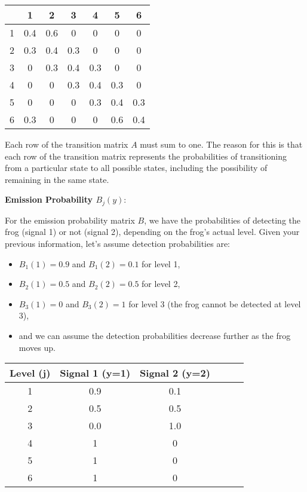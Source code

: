 \documentclass[10pt]{article}
\begin{document}
\begin{table}[h]
\begin{center}
\begin{tabular}{|c|c|c|c|c|c|c|}
\hline
 & 1 & 2 & 3 & 4 & 5 & 6\\
\hline
1 & 0.4 & 0.6 & 0 & 0 & 0 & 0 \\
\hline
2 & 0.3 & 0.4 & 0.3 & 0 & 0 & 0 \\
\hline
3 & 0 & 0.3 & 0.4 & 0.3 & 0 & 0 \\
\hline
4 & 0 & 0 & 0.3 & 0.4 & 0.3 & 0 \\
\hline
5 & 0 & 0 & 0 & 0.3 & 0.4 & 0.3 \\
\hline
6 & 0.3 & 0 & 0 & 0 & 0.6 & 0.4 \\
\hline
\end{tabular}
\end{center}
\end{table}

Each row of the transition matrix \( A \) must sum to one. The reason for this is that each row of the transition matrix represents the probabilities of transitioning from a particular state to all possible states, including the possibility of remaining in the same state.

\textbf{Emission Probability \( B_j(y) \)}:

For the emission probability matrix \( B \), we have the probabilities of detecting the frog (signal 1) or not (signal 2), depending on the frog's actual level. Given your previous information, let's assume detection probabilities are:

\begin{itemize}
  \item \( B_1(1) = 0.9 \) and \( B_1(2) = 0.1 \) for level 1,
  \item \( B_2(1) = 0.5 \) and \( B_2(2) = 0.5 \) for level 2,
  \item \( B_3(1) = 0 \) and \( B_3(2) = 1 \) for level 3 (the frog cannot be detected at level 3),
  \item and we can assume the detection probabilities decrease further as the frog moves up.
\end{itemize}

\begin{table}[h]
\begin{center}
\begin{tabular}{|c|c|c|c|c|c|}
\hline
Level (j) & Signal 1 (y=1) & Signal 2 (y=2)\\
\hline
1 & 0.9 & 0.1 \\
\hline
2 & 0.5 & 0.5 \\
\hline
3 & 0.0 & 1.0 \\
\hline
4 & 1 & 0 \\
\hline
5 & 1 & 0 \\
\hline
6 & 1 & 0 \\
\hline
\end{tabular}
\end{center}
\end{table}
\end{document}
